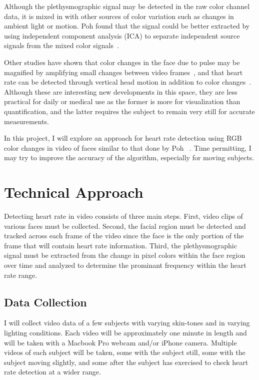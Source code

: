 \documentclass[11pt,twocolumn,letterpaper]{article}
\begin{document}
Although the plethysmographic signal may be detected in the raw color channel data, it is mixed in with other sources of color variation such as changes in ambient light or motion. Poh \etal found that the signal could be better extracted by using independent component analysis (ICA) to separate independent source signals from the mixed color signals~\cite{Poh:2010aa}.

Other studies have shown that color changes in the face due to pulse may be magnified by amplifying small changes between video frames~\cite{Wu:2012aa}, and that heart rate can be detected through vertical head motion in addition to color changes~\cite{Balakrishnan:2013aa}. Although these are interesting new developments in this space, they are less practical for daily or medical use as the former is more for visualization than quantification, and the latter requires the subject to remain very still for accurate measurements.

In this project, I will explore an approach for heart rate detection using RGB color changes in video of faces similar to that done by Poh \etal~\cite{Poh:2010aa}. Time permitting, I may try to improve the accuracy of the algorithm, especially for moving subjects.

\section*{Technical Approach}

Detecting heart rate in video consists of three main steps. First, video clips of various faces must be collected. Second, the facial region must be detected and tracked across each frame of the video since the face is the only portion of the frame that will contain heart rate information. Third, the plethysmographic signal must be extracted from the change in pixel colors within the face region over time and analyzed to determine the prominant frequency within the heart rate range.

\subsection*{Data Collection}

I will collect video data of a few subjects with varying skin-tones and in varying lighting conditions. Each video will be approximately one minute in length and will be taken with a Macbook Pro webcam and/or iPhone camera. Multiple videos of each subject will be taken, some with the subject still, some with the subject moving slightly, and some after the subject has exercised to check heart rate detection at a wider range.
\end{document}
